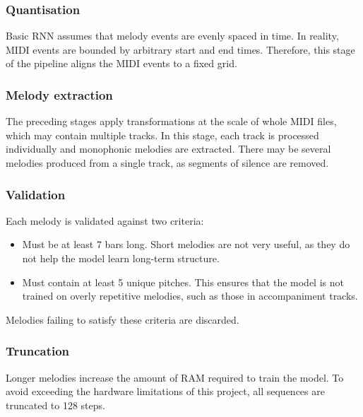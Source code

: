 \documentclass[../../report.tex]{subfiles}
\begin{document}

\subsubsection{Quantisation}

Basic RNN assumes that melody events are evenly spaced in time. In reality, MIDI
events are bounded by arbitrary start and end times. Therefore, this stage of
the pipeline aligns the MIDI events to a fixed grid.


\subsubsection{Melody extraction}

The preceding stages apply transformations at the scale of whole MIDI files,
which may contain multiple tracks. In this stage, each track is processed
individually and monophonic melodies are extracted. There may be several
melodies produced from a single track, as segments of silence are removed.

\subsubsection{Validation}

Each melody is validated against two criteria:

\begin{itemize}
  \item Must be at least 7 bars long. Short melodies are not very useful, as
  they do not help the model learn long-term structure.

  \item Must contain at least 5 unique pitches. This ensures that the model is
  not trained on overly repetitive melodies, such as those in accompaniment
  tracks.
\end{itemize}

Melodies failing to satisfy these criteria are discarded.

\subsubsection{Truncation}

Longer melodies increase the amount of RAM required to train the model. To avoid
exceeding the hardware limitations of this project, all sequences are truncated
to 128 steps.
\end{document}
